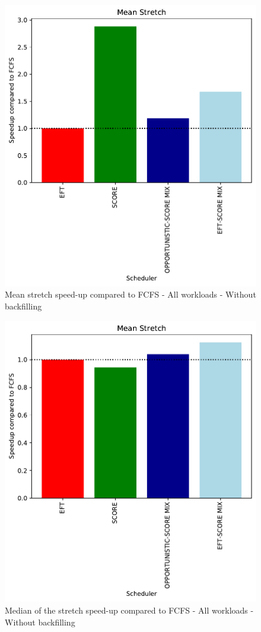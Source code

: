 \documentclass[conference,10pt]{IEEEtran}
\begin{document}
\begin{figure}\centering\includegraphics[width=1\linewidth]{../MBSS/plot/Results_Percentage_FCFS_All_workloads_mean_Mean_Stretch_450_128_32_256_4_1024.pdf}\caption{Mean stretch speed-up compared to FCFS - All workloads - Without backfilling}\end{figure}
\begin{figure}\centering\includegraphics[width=1\linewidth]{../MBSS/plot/Results_Percentage_FCFS_All_workloads_mediane_Mean_Stretch_450_128_32_256_4_1024.pdf}\caption{Median of the stretch speed-up compared to FCFS - All workloads - Without backfilling}\end{figure}
\end{document}

